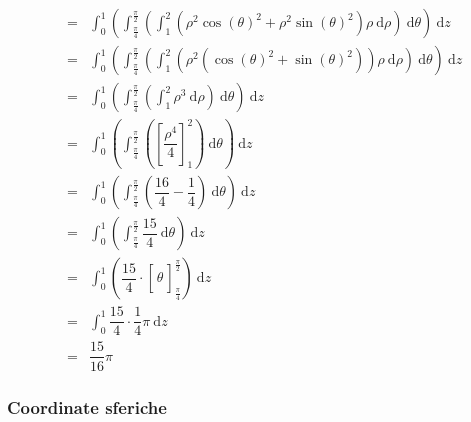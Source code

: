 \documentclass[a4paper]{article}
\begin{document}
	\begin{equation*}
		\begin{array}{rcl}
			&=&
			\displaystyle\int_{0}^{1} \left(
				\int_{\frac{\pi}{4}}^{\frac{\pi}{2}} \left(
					\int_{1}^{2} \left(\rho^{2}\cos\left(\theta\right)^{2}+\rho^{2}\sin\left(\theta\right)^{2}\right) \rho \:\mathrm{d}\rho
				\right) \:\mathrm{d}\theta
			\right) \:\mathrm{d}z \\ [1.5em]
			&=&
			\displaystyle\int_{0}^{1} \left(
				\int_{\frac{\pi}{4}}^{\frac{\pi}{2}} \left(
					\int_{1}^{2} \left(\rho^{2}\left(\cos\left(\theta\right)^{2}+\sin\left(\theta\right)^{2}\right)\right) \rho \:\mathrm{d}\rho
				\right) \:\mathrm{d}\theta
			\right) \:\mathrm{d}z \\ [1.5em]
			&=&
			\displaystyle\int_{0}^{1} \left(
				\int_{\frac{\pi}{4}}^{\frac{\pi}{2}} \left(
					\int_{1}^{2} \rho^{3} \:\mathrm{d}\rho
				\right) \:\mathrm{d}\theta
			\right) \:\mathrm{d}z \\ [1.5em]
			&=&
			\displaystyle\int_{0}^{1} \left(
				\int_{\frac{\pi}{4}}^{\frac{\pi}{2}} \left(
					\left[\dfrac{\rho^{4}}{4}\right]_{1}^{2}
				\right) \:\mathrm{d}\theta
			\right) \:\mathrm{d}z \\ [1.5em]
			&=&
			\displaystyle\int_{0}^{1} \left(
				\int_{\frac{\pi}{4}}^{\frac{\pi}{2}} \left(
					\dfrac{16}{4} - \dfrac{1}{4}
				\right) \:\mathrm{d}\theta
			\right) \:\mathrm{d}z \\ [1.5em]
			&=&
			\displaystyle\int_{0}^{1} \left(
				\int_{\frac{\pi}{4}}^{\frac{\pi}{2}} \dfrac{15}{4} \:\mathrm{d}\theta
			\right) \:\mathrm{d}z \\ [1.5em]
			&=&
			\displaystyle\int_{0}^{1} \left(
				\dfrac{15}{4} \cdot \left[\dfrac{}{} \theta \dfrac{}{} \right]_{\frac{\pi}{4}}^{\frac{\pi}{2}}
			\right) \:\mathrm{d}z \\ [1.5em]
			&=&
			\displaystyle\int_{0}^{1} \dfrac{15}{4} \cdot \dfrac{1}{4}\pi \:\mathrm{d}z \\ [1.5em]
			&=&
			\dfrac{15}{16}\pi
		\end{array}
	\end{equation*}\newpage

	\subsubsection{Coordinate sferiche}\label{subsubsection: coordinate sferiche}
\end{document}
